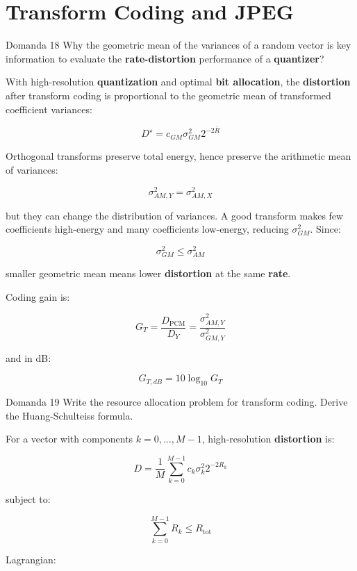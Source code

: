 \section{Transform Coding and JPEG}




\begin{questionbox}{Domanda 18}
Why the geometric mean of the variances of a random vector is key information to evaluate the \textbf{\textbf{rate}-\textbf{distortion}} performance of a \textbf{quantizer}?
\end{questionbox}


With high-resolution \textbf{quantization} and optimal \textbf{bit allocation}, the \textbf{distortion} after transform coding is proportional to the geometric mean of transformed coefficient variances:


$$
D^\star = c_{GM}\sigma_{GM}^2 2^{-2\bar{R}}
$$


Orthogonal transforms preserve total energy, hence preserve the arithmetic mean of variances:


$$
\sigma_{AM,Y}^2 = \sigma_{AM,X}^2
$$


but they can change the distribution of variances. A good transform makes few coefficients high-energy and many coefficients low-energy, reducing $\sigma_{GM}^2$. Since:


$$
\sigma_{GM}^2 \le \sigma_{AM}^2
$$


smaller geometric mean means lower \textbf{distortion} at the same \textbf{rate}.

Coding gain is:


$$
G_T = \frac{D_{\text{PCM}}}{D_Y}
=\frac{\sigma_{AM,Y}^2}{\sigma_{GM,Y}^2}
$$


and in dB:


$$
G_{T,dB}=10\log_{10}G_T
$$




\begin{questionbox}{Domanda 19}
Write the resource allocation problem for transform coding. Derive the Huang-Schulteiss formula.
\end{questionbox}


For a vector with components $k=0,\dots,M-1$, high-resolution \textbf{distortion} is:


$$
D = \frac{1}{M}\sum_{k=0}^{M-1} c_k\sigma_k^2 2^{-2R_k}
$$


subject to:


$$
\sum_{k=0}^{M-1} R_k \le R_{\text{tot}}
$$


Lagrangian:



